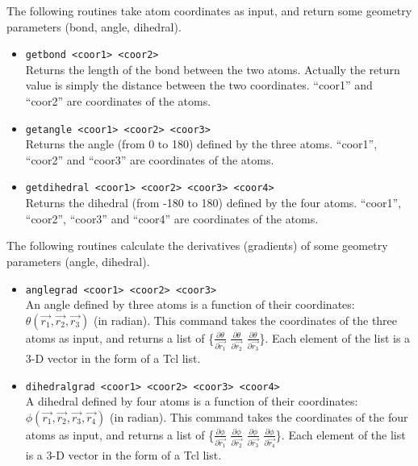 The following routines take atom coordinates as input, and return
some geometry parameters (bond, angle, dihedral).

\begin{itemize}

\item
{\tt getbond <coor1> <coor2>} \\
Returns the length of the bond between the two atoms. Actually
the return value is simply the distance between the two
coordinates. ``coor1'' and ``coor2'' are coordinates of the atoms.

\item
{\tt getangle <coor1> <coor2> <coor3>} \\
Returns the angle (from 0 to 180) defined by the
three atoms. ``coor1'', ``coor2'' and ``coor3'' are coordinates of
the atoms.

\item
{\tt getdihedral <coor1> <coor2> <coor3> <coor4>} \\
Returns the dihedral (from -180 to 180) defined by the
four atoms. ``coor1'', ``coor2'', ``coor3'' and ``coor4'' are
coordinates of the atoms.

\end{itemize}

The following routines calculate the derivatives (gradients) of
some geometry parameters (angle, dihedral).

\begin{itemize}

\item
{\tt anglegrad <coor1> <coor2> <coor3>} \\
An angle defined by three atoms is a function of their
coordinates:
$\theta\left(\vec{r_1},\vec{r_2},\vec{r_3}\right)$ (in radian).
This command takes the coordinates of the three atoms as input,
and returns a list of \{$\frac{\partial\theta}{\partial\vec{r_1}}$
$\frac{\partial\theta}{\partial\vec{r_2}}$
$\frac{\partial\theta}{\partial\vec{r_3}}$\}. Each element of the
list is a 3-D vector in the form of a Tcl list.

\item
{\tt dihedralgrad <coor1> <coor2> <coor3> <coor4>} \\
A dihedral defined by four atoms is a function of their
coordinates:
$\phi\left(\vec{r_1},\vec{r_2},\vec{r_3},\vec{r_4}\right)$ (in
radian). This command takes the coordinates of the four atoms as
input, and returns a list of
\{$\frac{\partial\phi}{\partial\vec{r_1}}$
$\frac{\partial\phi}{\partial\vec{r_2}}$
$\frac{\partial\phi}{\partial\vec{r_3}}$
$\frac{\partial\phi}{\partial\vec{r_4}}$\}. Each element of the
list is a 3-D vector in the form of a Tcl list.

\end{itemize}

